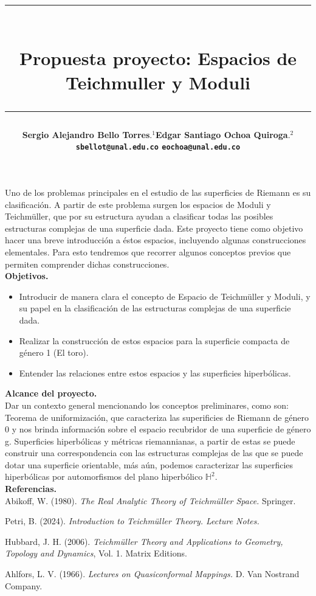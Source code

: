 \documentclass[12pt]{article}
\title{\vspace{-2cm}\par\noindent\rule{16cm}{1pt}\large
\\\bfseries Propuesta proyecto: Espacios de Teichmuller y Moduli
\vspace{-0.34cm}\par\noindent\hspace{0.15cm}\rule{16cm}{1pt}
\vspace{-0.6cm}
}
\author{\small \bfseries Sergio Alejandro Bello Torres$.^{1}$\quad \quad\small Edgar Santiago Ochoa Quiroga$.^{2}$\\ \small \quad \texttt{sbellot@unal.edu.co} \quad \quad \quad \quad \quad \quad \texttt{eochoa@unal.edu.co}\quad\quad \quad\\}
\begin{document}
\maketitle

Uno de los problemas principales en el estudio de las superficies de Riemann es su clasificación. A partir de este problema surgen los espacios de Moduli y Teichmüller, que por su estructura ayudan a clasificar todas las posibles estructuras complejas de una superficie dada. Este proyecto tiene como objetivo hacer una breve introducción a éstos espacios, incluyendo algunas construcciones elementales. Para esto tendremos que recorrer algunos conceptos previos que permiten comprender dichas construcciones.\\

\textbf{Objetivos.}
\begin{itemize}
    \item Introducir de manera clara el concepto de Espacio de Teichmüller y Moduli, y su papel en la clasificación de las estructuras complejas de una superficie dada.
    \item Realizar la construcción de estos espacios para la superficie compacta de género 1 (El toro).
    \item Entender las relaciones entre estos espacios y las superficies hiperbólicas.
\end{itemize}

\textbf{Alcance del proyecto.}\\
    
    Dar un contexto general mencionando los conceptos preliminares, como son: Teorema de uniformización, que caracteriza las superificies de Riemann de género 0 y nos brinda información sobre el espacio recubridor de una superficie de género g. Superficies hiperbólicas y métricas riemannianas, a partir de estas se puede construir una correspondencia con las estructuras complejas de las que se puede dotar una superficie orientable, más aún, podemos caracterizar las superficies hiperbólicas por automorfismos del plano hiperbólico $\mathbb{H}^2$.\\ 

    \textbf{Referencias.}\\ 

    Abikoff, W. (1980). \textit{The Real Analytic Theory of Teichmüller Space.} Springer.

    Petri, B. (2024). \textit{Introduction to Teichmüller Theory. Lecture Notes.}

    Hubbard, J. H. (2006). \textit{Teichmüller Theory and Applications to Geometry, Topology and Dynamics}, Vol. 1. Matrix Editions.

    Ahlfors, L. V. (1966). \textit{Lectures on Quasiconformal Mappings.} D. Van Nostrand Company.
\end{document}
